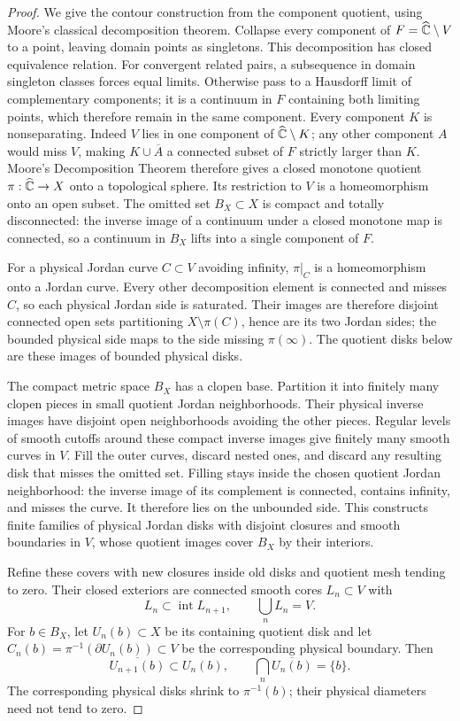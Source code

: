 \begin{proof}
We give the contour construction from the component quotient, using
Moore's classical decomposition theorem.  Collapse every component of
$F=\widehat{\mathbb C}\setminus V$ to a point, leaving domain points as singletons.
This decomposition has closed equivalence relation.  For convergent
related pairs, a subsequence in domain singleton classes forces equal
limits.  Otherwise pass to a Hausdorff limit of complementary components;
it is a continuum in $F$ containing both limiting points, which therefore
remain in the same component.  Every
component $K$ is nonseparating.  Indeed $V$ lies in one component of
$\widehat{\mathbb C}\setminus K$; any other component $A$ would miss $V$, making
$K\cup\overline A$ a connected subset of $F$ strictly larger than $K$.
Moore's Decomposition Theorem \cite{Moore1925} therefore gives a closed
monotone quotient $\pi:\widehat{\mathbb C}\to X$ onto a topological sphere.
Its restriction to $V$ is a homeomorphism onto an open subset.
The omitted set $B_X\subset X$ is compact and totally disconnected:
the inverse image of a continuum under a closed monotone map is
connected, so a continuum in $B_X$ lifts into a single component of $F$.

For a physical Jordan curve $C\subset V$ avoiding infinity,
$\pi|_C$ is a homeomorphism onto a Jordan curve.  Every other
decomposition element is connected and misses $C$, so each physical
Jordan side is saturated.  Their images are therefore disjoint
connected open sets partitioning $X\setminus\pi(C)$, hence are its two
Jordan sides; the bounded physical side maps to the side missing
$\pi(\infty)$.  The quotient disks below are these images of bounded
physical disks.

The compact metric space $B_X$ has a clopen base.  Partition it into
finitely many clopen pieces in small quotient Jordan neighborhoods.
Their physical inverse images have disjoint open neighborhoods
avoiding the other pieces.  Regular levels of smooth cutoffs around
these compact inverse images give finitely many smooth curves in $V$.
Fill the outer curves, discard nested ones, and discard any resulting
disk that misses the omitted set.  Filling stays inside
the chosen quotient Jordan neighborhood: the inverse image of its
complement is connected, contains infinity, and misses the curve.
It therefore lies on the unbounded side.  This constructs finite
families of physical Jordan disks with disjoint closures and smooth
boundaries in $V$, whose quotient images cover $B_X$ by their interiors.

Refine these covers with new closures inside old disks and quotient
mesh tending to zero.  Their closed exteriors are connected smooth
cores $L_n\subset V$ with
\[
 L_n\subset\operatorname{int}L_{n+1},\qquad
 \bigcup_nL_n=V.
\]
For $b\in B_X$, let $U_n(b)\subset X$ be its containing quotient disk
and let $C_n(b)=\pi^{-1}(\partial U_n(b))\subset V$ be the corresponding
physical boundary.  Then
\[
 \overline{U_{n+1}(b)}\subset U_n(b),\qquad
 \bigcap_n\overline{U_n(b)}=\{b\}.
\]
The corresponding physical disks shrink to $\pi^{-1}(b)$; their
physical diameters need not tend to zero.


\end{proof}
